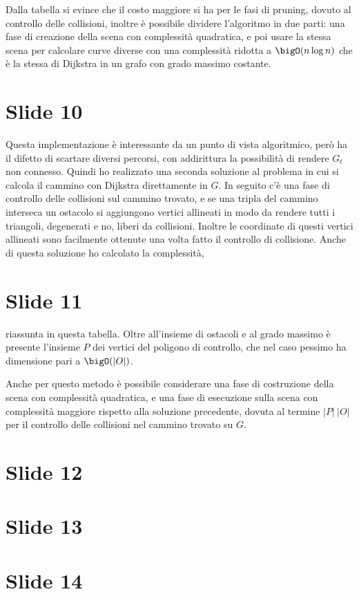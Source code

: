 \documentclass{article}
\begin{document}
Dalla tabella si evince che il costo maggiore si ha per le fasi di
pruning, dovuto al controllo delle collisioni, inoltre è possibile
dividere l'algoritmo in due parti: una fase di creazione della scena
con complessità quadratica, e poi usare la stessa scena per calcolare
curve diverse con una complessità ridotta a $\bigO(n\log n)$ che è la
stessa di Dijkstra in un grafo con grado massimo costante.

\section*{Slide 10}
Questa implementazione è interessante da un punto di vista
algoritmico, però ha il difetto di scartare diversi percorsi, con
addirittura la possibilità di rendere $G_t$ non connesso. Quindi
ho realizzato una seconda soluzione al problema in cui si calcola il
cammino con Dijkstra direttamente in $G$. In seguito c'è una fase di
controllo delle collisioni sul cammino trovato, e se una tripla del
cammino interseca un ostacolo si aggiungono vertici allineati in modo
da rendere tutti i triangoli, degenerati e no, liberi da
collisioni. Inoltre le coordinate di questi vertici allineati sono
facilmente ottenute una volta fatto il controllo di collisione. Anche
di questa soluzione ho calcolato la complessità,

\section*{Slide 11}
riassunta in questa tabella. Oltre all'insieme di ostacoli e al grado
massimo è presente l'insieme $P$ dei vertici del poligono di
controllo, che nel caso pessimo ha dimensione pari a $\bigO(|O|)$.

Anche per questo metodo è possibile considerare una fase di
costruzione della scena con complessità quadratica, e una fase di
esecuzione sulla scena con complessità maggiore rispetto alla
soluzione precedente, dovuta al termine $|P|\ |O|$ per il controllo
delle collisioni nel cammino trovato su $G$.

\section*{Slide 12}

\section*{Slide 13}

\section*{Slide 14}
\end{document}
